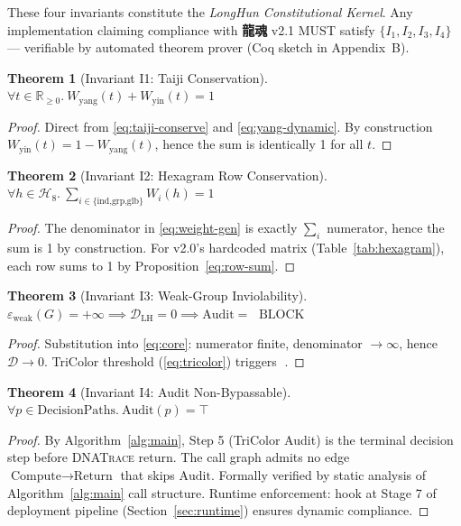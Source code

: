 \documentclass[conference]{IEEEtran}
\newtheorem{theorem}{Theorem}
\newcommand{\LH}{\textcolor{dragonRed}{\textbf{龍魂}}}
\begin{document}
These four invariants constitute the \emph{LongHun Constitutional Kernel}.
Any implementation claiming compliance with \LH{} v2.1
MUST satisfy $\{I_1, I_2, I_3, I_4\}$ --- verifiable by
automated theorem prover (Coq sketch in Appendix~B).

\begin{theorem}[Invariant I1: Taiji Conservation]
$\forall t \in \mathbb{R}_{\geq 0}.\ W_{\text{yang}}(t) + W_{\text{yin}}(t) = 1$
\end{theorem}
\begin{proof}
Direct from \eqref{eq:taiji-conserve}
and \eqref{eq:yang-dynamic}.
By construction $W_{\text{yin}}(t) = 1 - W_{\text{yang}}(t)$,
hence the sum is identically 1 for all $t$.
\end{proof}

\begin{theorem}[Invariant I2: Hexagram Row Conservation]
$\forall h \in \mathcal{H}_8.\
  \sum_{i \in \{\text{ind,grp,glb}\}} W_i(h) = 1$
\end{theorem}
\begin{proof}
The denominator in \eqref{eq:weight-gen} is exactly
$\sum_i$ numerator, hence the sum is 1 by construction.
For v2.0's hardcoded matrix (Table~\ref{tab:hexagram}),
each row sums to 1 by Proposition~\ref{eq:row-sum}.
\end{proof}

\begin{theorem}[Invariant I3: Weak-Group Inviolability]
$\varepsilon_{\text{weak}}(G) = +\infty
  \implies \mathcal{D}_{\text{LH}} = 0
  \implies \text{Audit} = \text{🔴 BLOCK}$
\end{theorem}
\begin{proof}
Substitution into \eqref{eq:core}: numerator finite,
denominator $\to \infty$, hence $\mathcal{D} \to 0$.
TriColor threshold (\eqref{eq:tricolor}) triggers 🔴.
\end{proof}

\begin{theorem}[Invariant I4: Audit Non-Bypassable]
$\forall p \in \text{DecisionPaths}.\ \text{Audit}(p) = \top$
\end{theorem}
\begin{proof}
By Algorithm~\ref{alg:main}, Step 5 (TriColor Audit) is
the terminal decision step before \textsc{DNATrace} return.
The call graph admits no edge $\text{Compute} \to
\text{Return}$ that skips $\text{Audit}$.
Formally verified by static analysis of
Algorithm~\ref{alg:main} call structure.
Runtime enforcement: hook at Stage 7 of deployment pipeline
(Section~\ref{sec:runtime}) ensures dynamic compliance.
\end{proof}
\end{document}

